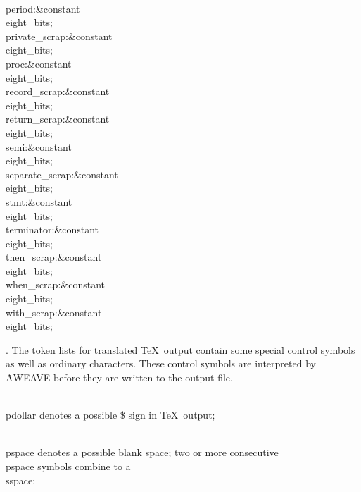 \\{period}\?:\?\&{constant}\8\\{eight\_bits}\?\K{};\6
\\{private\_scrap}\?:\?\&{constant}\8\\{eight\_bits}\?\K{};\6
\\{proc}\?:\?\&{constant}\8\\{eight\_bits}\?\K{};\6
\\{record\_scrap}\?:\?\&{constant}\8\\{eight\_bits}\?\K{};\6
\\{return\_scrap}\?:\?\&{constant}\8\\{eight\_bits}\?\K{};\6
\\{semi}\?:\?\&{constant}\8\\{eight\_bits}\?\K{};\6
\\{separate\_scrap}\?:\?\&{constant}\8\\{eight\_bits}\?\K{};\6
\\{stmt}\?:\?\&{constant}\8\\{eight\_bits}\?\K{};\6
\\{terminator}\?:\?\&{constant}\8\\{eight\_bits}\?\K{};\6
\\{then\_scrap}\?:\?\&{constant}\8\\{eight\_bits}\?\K{};\6
\\{when\_scrap}\?:\?\&{constant}\8\\{eight\_bits}\?\K{};\6
\\{with\_scrap}\?:\?\&{constant}\8\\{eight\_bits}\?\K{};\par
\fi

. The token lists for translated \TeX\ output contain some special control
symbols as well as ordinary characters. These control symbols are
interpreted by \.{AWEAVE} before they are written to the output file.

\yskip\hang \\{pdollar} denotes a possible \.\$ sign in \TeX\ output;

\yskip\hang \\{pspace} denotes a possible blank space; two or more
consecutive \\{pspace} symbols combine to a \\{sspace};

